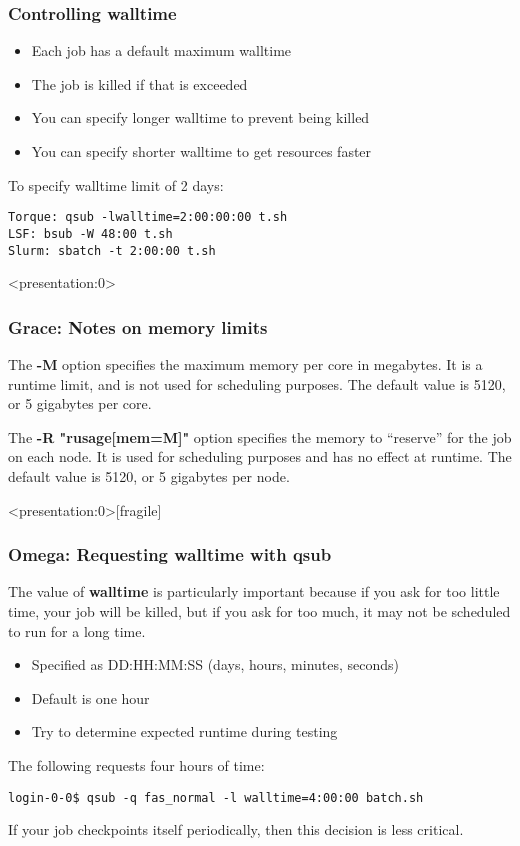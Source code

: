 \documentclass[10pt]{beamer}
\begin{document}
\begin{frame}[fragile]
\frametitle{Controlling walltime}
\begin{itemize}
\item Each job has a default maximum walltime
\item The job is killed if that is exceeded
\item You can specify longer walltime to prevent being killed
\item You can specify shorter walltime to get resources faster
\end{itemize}

To specify walltime limit of 2 days:
\begin{verbatim}
Torque: qsub -lwalltime=2:00:00:00 t.sh
LSF: bsub -W 48:00 t.sh
Slurm: sbatch -t 2:00:00 t.sh

\end{verbatim}
\end{frame}

\begin{frame}<presentation:0>
\frametitle{Grace: Notes on memory limits}
The \textbf{-M} option specifies the maximum memory per core in
megabytes.
It is a runtime limit, and is not used for scheduling purposes.
The default value is 5120, or 5 gigabytes per core.

\vskip10pt
The \textbf{-R "rusage[mem=M]"} option specifies the memory to ``reserve''
for the job on each node. It is used for scheduling purposes and has no
effect at runtime.
The default value is 5120, or 5 gigabytes per node.
\end{frame}

\begin{frame}<presentation:0>[fragile]
\frametitle{Omega: Requesting walltime with qsub}
The value of \textbf{walltime} is particularly important because if you
ask for too little time, your job will be killed, but if you ask for too
much, it may not be scheduled to run for a long time.

\begin{itemize}
\item Specified as DD:HH:MM:SS (days, hours, minutes, seconds)
\item Default is one hour
\item Try to determine expected runtime during testing
\end{itemize}

The following requests four hours of time:

\begin{verbatim}
login-0-0$ qsub -q fas_normal -l walltime=4:00:00 batch.sh
\end{verbatim}

If your job checkpoints itself periodically, then this decision is
less critical.
\end{frame}
\end{document}
